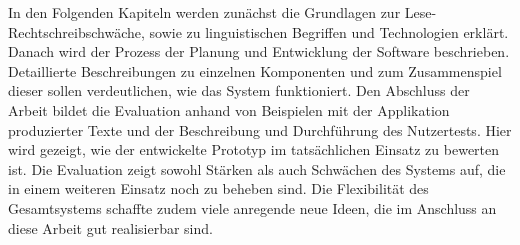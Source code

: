 In den Folgenden Kapiteln werden zunächst die Grundlagen zur Lese-Rechtschreibschwäche, sowie zu linguistischen Begriffen und Technologien erklärt. Danach wird der Prozess der Planung und Entwicklung der Software beschrieben. Detaillierte Beschreibungen zu einzelnen Komponenten und zum Zusammenspiel dieser sollen verdeutlichen, wie das System funktioniert. Den Abschluss der Arbeit bildet die Evaluation anhand von Beispielen mit der Applikation produzierter Texte und der Beschreibung und Durchführung des Nutzertests. Hier wird gezeigt, wie der entwickelte Prototyp im tatsächlichen Einsatz zu bewerten ist. Die Evaluation zeigt sowohl Stärken als auch Schwächen des Systems auf, die in einem weiteren Einsatz noch zu beheben sind. Die Flexibilität des Gesamtsystems schaffte zudem viele anregende neue Ideen, die im Anschluss an diese Arbeit gut realisierbar sind.